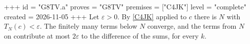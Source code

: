 +++
id = "G8TV.a"
proves = "G8TV"
premises = ["C4JK"]
level = "complete"
created = 2026-11-05
+++
Let $\varepsilon > 0$. By \ref{C4JK} applied to $c$ there is $N$ with $T_N(c) < \varepsilon$. The finitely many terms below $N$ converge, and the terms from $N$ on contribute at most $2 \varepsilon$ to the difference of the sums, for every $k$.
